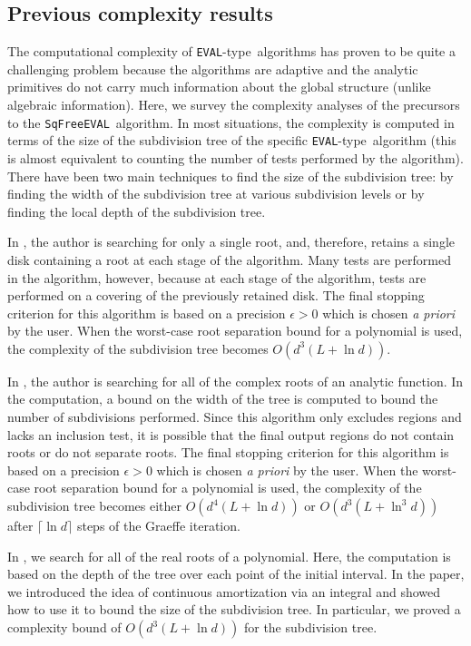 \documentclass{amsart}
\theoremstyle{definition}
\newcommand{\EVAL}{\texttt{SqFreeEVAL}}
\newcommand{\EVALTYPE}{\texttt{EVAL}-type}
\begin{document}
\subsection{Previous complexity results}

The computational complexity of \EVALTYPE\ algorithms has proven to be quite a challenging problem because the algorithms are adaptive and the analytic primitives do not carry much information about the global structure (unlike algebraic information).  Here, we survey the complexity analyses of the precursors to the \EVAL\ algorithm.  In most situations, the complexity is computed in terms of the size of the subdivision tree of the specific \EVALTYPE\ algorithm (this is almost equivalent to counting the number of tests performed by the algorithm). There have been two main techniques to find the size of the subdivision tree: by finding the width of the subdivision tree at various subdivision levels or by finding the local depth of the subdivision tree.

In \citep{Henrici:search:70}, the author is searching for only a single root, and, therefore, retains a single disk containing a root at each stage of the algorithm.  Many tests are performed in the algorithm, however, because at each stage of the algorithm, tests are performed on a covering of the previously retained disk. The final stopping criterion for this algorithm is based on a precision $\epsilon>0$ which is chosen {\em a priori} by the user.  When the worst-case root separation bound for a polynomial is used, the complexity of the subdivision tree becomes $O(d^3(L+\ln d))$.

In \citep{Yakoubsohn:bisection:05}, the author is searching for all of the complex roots of an analytic function.  In the computation, a bound on the width of the tree is computed to bound the number of subdivisions performed.  Since this algorithm only excludes regions and lacks an inclusion test, it is possible that the final output regions do not contain roots or do not separate roots.  The final stopping criterion for this algorithm is based on a precision $\epsilon>0$ which is chosen {\em a priori} by the user. When the worst-case root separation bound for a polynomial is used, the complexity of the subdivision tree becomes either $O(d^4(L+\ln d))$ or $O(d^3(L+\ln^3 d))$ after $\lceil\ln d\rceil$ steps of the Graeffe iteration.

In \citep{Burr-Krahmer-Yap:integral:09}, we search for all of the real roots of a polynomial.  Here, the computation is based on the depth of the tree over each point of the initial interval.  In the paper, we introduced the idea of continuous amortization via an integral and showed how to use it to bound the size of the subdivision tree.  In particular, we proved a complexity bound of $O(d^3(L+\ln d))$ for the subdivision tree.
\end{document}

